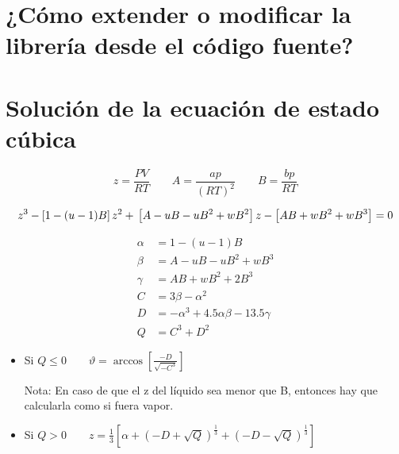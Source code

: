 \chapter{¿Cómo extender o modificar la librería desde el código fuente?}\label{chap:github}




\chapter{Solución de la ecuación de estado cúbica}\label{chap:cubicsolution}



\begin{equation}
z= \frac{P V}{R T}
\qquad
A=\frac{ap}{(RT)^2}
\qquad
B=\frac{bp}{RT}
\end{equation}

\begin{equation}
z^3-\left[1-(u-1)B\right]z^2+ \\ \left[A-uB-uB^2 +\\ wB^2\right]z-\left[AB+wB^2+wB^3\right]=0
\end{equation}


\begin{align}
\alpha &= 1-(u-1)B\\
\beta &= A -uB-uB^2+wB^3\\
\gamma &= AB +wB^2+ 2B^3\\
C &= 3\beta - \alpha^2\\
D&= - \alpha^3+ 4.5 \alpha \beta -13.5 \gamma\\
Q&=C^3+D^2
\end{align}


\begin{itemize}
\item Si $Q \leq 0 \qquad \vartheta = \arccos \left[\frac{-D}{\sqrt{-C^3}}\right]$
Nota: En caso de que el z del líquido sea menor que B, entonces hay que calcularla como si fuera vapor.
\item Si $Q > 0 \qquad z = \frac{1}{3}\left[\alpha + \left(-D + \sqrt{Q}\right)^{\frac{1}{3}}+ \left(-D - \sqrt{Q}\right)^{\frac{1}{3}} \right]$
\end{itemize}